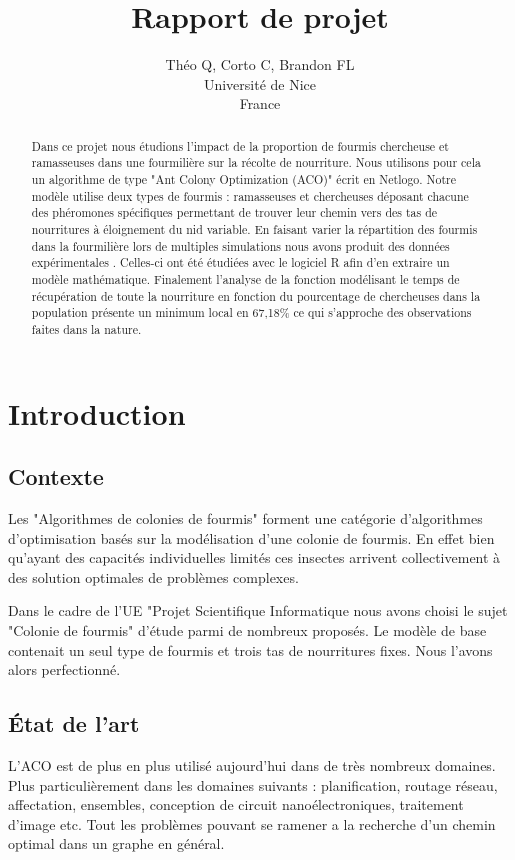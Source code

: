 \documentclass{article}
\title{Rapport de projet}
\author{Théo Q, Corto C, Brandon FL \\
Université de Nice\\
France}
\begin{document}
\maketitle


\begin{abstract}
Dans ce projet nous étudions l'impact de la proportion de fourmis chercheuse et ramasseuses dans une fourmilière sur la récolte de nourriture. Nous utilisons pour cela un algorithme de type "Ant Colony Optimization (ACO)" écrit en Netlogo. Notre modèle utilise deux types de fourmis : ramasseuses et chercheuses déposant chacune des phéromones spécifiques permettant de trouver leur chemin vers des tas de nourritures à éloignement du nid variable. En faisant varier la répartition des fourmis dans la fourmilière lors de multiples simulations nous avons produit des données expérimentales . Celles-ci ont été étudiées avec le logiciel R afin d'en extraire un modèle mathématique. Finalement l'analyse de la fonction modélisant le temps de récupération de toute la nourriture en fonction du pourcentage de chercheuses dans la population présente un minimum local en 67,18\% ce qui s'approche des observations faites dans la nature.
\end{abstract}
\section{Introduction}
\subsection{Contexte}
Les "Algorithmes de colonies de fourmis" forment une catégorie d'algorithmes d'optimisation basés sur la modélisation d'une colonie de fourmis. En effet bien qu'ayant des capacités individuelles limités ces insectes arrivent collectivement à des solution optimales de problèmes complexes. 



Dans le cadre de l'UE "Projet Scientifique Informatique nous avons choisi le sujet "Colonie de fourmis" d'étude parmi de nombreux proposés. Le modèle de base contenait un seul type de fourmis et trois tas de nourritures fixes. Nous l'avons alors perfectionné.
\subsection{État de l'art}
L'ACO est de plus en plus utilisé aujourd'hui dans de très nombreux domaines. Plus particulièrement dans les domaines suivants : planification, routage réseau, affectation, ensembles, conception de circuit nanoélectroniques, traitement d'image etc. Tout les problèmes pouvant se ramener a la recherche d'un chemin optimal dans un graphe en général.
\end{document}
